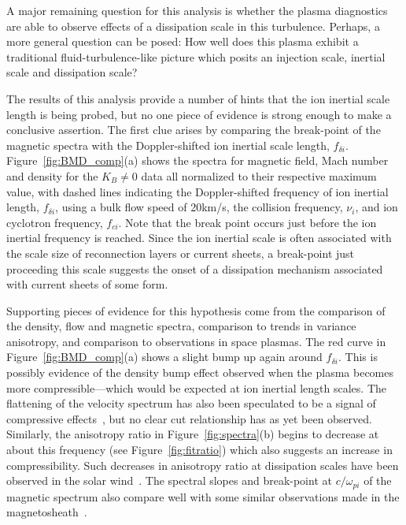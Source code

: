 \documentclass[aip,prl,amsmath,amssymb,reprint,superscriptaddress]{revtex4-1} %
\begin{document}
A major remaining question for this analysis is whether the plasma diagnostics are able to observe effects of a dissipation scale in this turbulence. Perhaps, a more general question can be posed: How well does this plasma exhibit a traditional fluid-turbulence-like picture which posits an injection scale, inertial scale and dissipation scale?

The results of this analysis provide a number of hints that the ion inertial scale length is being probed, but no one piece of evidence is strong enough to make a conclusive assertion. The first clue arises by comparing the break-point of the magnetic spectra with the Doppler-shifted ion inertial scale length, $f_{\delta i}$. Figure~\ref{fig:BMD_comp}(a) shows the spectra for magnetic field, Mach number and density for the $K_{B}\neq 0$ data all normalized to their respective maximum value, with dashed lines indicating the Doppler-shifted frequency of ion inertial length, $f_{\delta i}$, using a bulk flow speed of 20km/s, the collision frequency, $\nu_{i}$, and ion cyclotron frequency, $f_{ci}$. Note that the break point occurs just before the ion inertial frequency is reached. Since the ion inertial scale is often associated with the scale size of reconnection layers or current sheets, a break-point just proceeding this scale suggests the onset of a dissipation mechanism associated with current sheets of some form.

Supporting pieces of evidence for this hypothesis come from the comparison of the density, flow and magnetic spectra, comparison to trends in variance anisotropy, and comparison to observations in space plasmas. The red curve in Figure~\ref{fig:BMD_comp}(a) shows a slight bump up again around $f_{\delta i}$. This is possibly evidence of the density bump effect observed when the plasma becomes more compressible---which would be expected at ion inertial length scales. The flattening of the velocity spectrum has also been speculated to be a signal of compressive effects~\cite{roberts10}, but no clear cut relationship has as yet been observed. Similarly, the anisotropy ratio in Figure~\ref{fig:spectra}(b) begins to decrease at about this frequency (see Figure~\ref{fig:fitratio}) which also suggests an increase in compressibility. Such decreases in anisotropy ratio at dissipation scales have been observed in the solar wind~\cite{hamilton08,kiyani13}. The spectral slopes and break-point at $c/\omega_{pi}$ of the magnetic spectrum also compare well with some similar observations made in the magnetosheath~\cite{yordanova08}.
\end{document}

